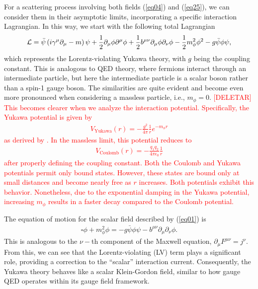 \documentclass[11pt,showpacs,preprintnumbers,amsmath,amssymb,prd,nofootinbib,superscriptaddress]{revtex4-2}
\begin{document}
For a scattering process involving both fields (\ref{eq04}) and (\ref{eq25}), we can consider them in their asymptotic limits, incorporating a specific interaction Lagrangian. In this way, we start with the following total Lagrangian
\begin{eqnarray}
\label{1}
    \mathcal{L}=\Bar{\psi}\left(i\gamma^\mu\partial_\mu-m\right)\psi+\frac{1}{2}\partial_\mu\phi\partial^\mu\phi +\frac{1}{2}b^{\mu\nu}\partial_\mu\phi\partial_\nu\phi -\frac{1}{2}m_\phi^2\phi^2-g\Bar{\psi}\phi\psi,\label{eq01}
\end{eqnarray}
which represents the Lorentz-violating Yukawa theory, with $g$ being the coupling constant. This is analogous to QED theory, where fermions interact through an intermediate particle, but here the intermediate particle is a scalar boson rather than a spin-1 gauge boson. The similarities are quite evident and become even more pronounced when considering a massless particle, i.e., $m_\phi=0$. \textcolor{red}{[DELETAR] This becomes clearer when we analyze the interaction potential. Specifically, the Yukawa potential is given by
\begin{eqnarray}
    V_{\text{Yukawa}}(r)=-\frac{g^2}{4\pi}\frac{1}{r}e^{-m_\phi r}\label{eq28}
\end{eqnarray}
as derived by \cite{peskin}. In the massless limit, this potential reduces to
\begin{eqnarray}
    V_{\text{Coulomb}}(r)=-\frac{q_1q_2}{4\pi\epsilon_0}\frac{1}{r}
\end{eqnarray}
after properly defining the coupling constant. Both the Coulomb and Yukawa potentials permit only bound states. However, these states are bound only at small distances and become nearly free as $r$ increases. Both potentials exhibit this behavior. Nonetheless, due to the exponential damping in the Yukawa potential, increasing $m_\phi$ results in a faster decay compared to the Coulomb potential.}

The equation of motion for the scalar field described by (\ref{eq01}) is
\begin{eqnarray}
    \square\phi+m_{\phi}^2\phi=-g\bar{\psi}\phi\psi-b^{\mu\nu}\partial_\mu\partial_\nu\phi.
\end{eqnarray}
This is analogous to the $\nu-$th component of the Maxwell equation, $\partial_\mu F^{\mu\nu}=j^\nu$. From this, we can see that the Lorentz-violating (LV) term plays a significant role, providing a correction to the ``scalar'' interaction current. Consequently, the Yukawa theory behaves like a scalar Klein-Gordon field, similar to how gauge QED operates within its gauge field framework.
\end{document}
